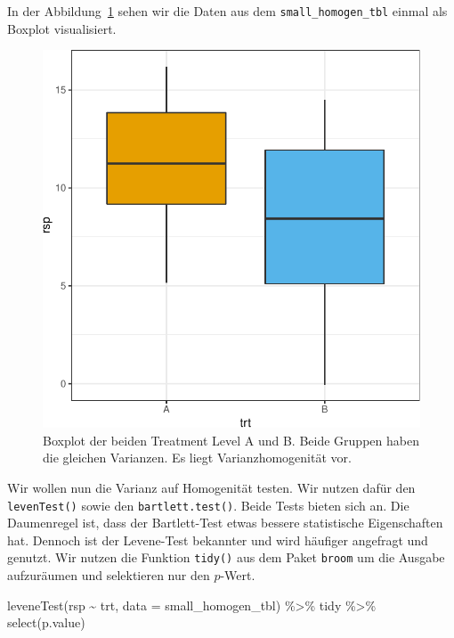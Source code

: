 \documentclass[
  letterpaper,
]{scrbook}
\newenvironment{Shaded}{\begin{snugshade}}{\end{snugshade}}
\newcommand{\AttributeTok}[1]{\textcolor[rgb]{0.40,0.45,0.13}{#1}}
\newcommand{\FunctionTok}[1]{\textcolor[rgb]{0.28,0.35,0.67}{#1}}
\newcommand{\NormalTok}[1]{\textcolor[rgb]{0.00,0.23,0.31}{#1}}
\newcommand{\SpecialCharTok}[1]{\textcolor[rgb]{0.37,0.37,0.37}{#1}}
\begin{document}
In der Abbildung~\ref{fig-vartest-1} sehen wir die Daten aus dem
\texttt{small\_homogen\_tbl} einmal als Boxplot visualisiert.

\begin{figure}

{\centering \includegraphics{./stat-tests-pretest_files/figure-pdf/fig-vartest-1-1.pdf}

}

\caption{\label{fig-vartest-1}Boxplot der beiden Treatment Level A und
B. Beide Gruppen haben die gleichen Varianzen. Es liegt
Varianzhomogenität vor.}

\end{figure}

Wir wollen nun die Varianz auf Homogenität testen. Wir nutzen dafür den
\texttt{levenTest()} sowie den \texttt{bartlett.test()}. Beide Tests
bieten sich an. Die Daumenregel ist, dass der Bartlett-Test etwas
bessere statistische Eigenschaften hat. Dennoch ist der Levene-Test
bekannter und wird häufiger angefragt und genutzt. Wir nutzen die
Funktion \texttt{tidy()} aus dem Paket \texttt{broom} um die Ausgabe
aufzuräumen und selektieren nur den \(p\)-Wert.

\begin{Shaded}
\begin{Highlighting}[]
\FunctionTok{leveneTest}\NormalTok{(rsp }\SpecialCharTok{\textasciitilde{}}\NormalTok{ trt, }\AttributeTok{data =}\NormalTok{ small\_homogen\_tbl) }\SpecialCharTok{\%\textgreater{}\%}\NormalTok{ tidy }\SpecialCharTok{\%\textgreater{}\%} \FunctionTok{select}\NormalTok{(p.value)}
\end{Highlighting}
\end{Shaded}
\end{document}
